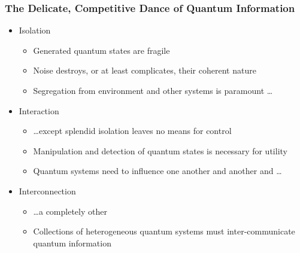 \documentclass[handout]{beamer}
\begin{document}
\begin{frame}
  \frametitle{The Delicate, Competitive Dance of Quantum Information}
  \begin{itemize}
  \item Isolation
    \begin{itemize}
    \item Generated quantum states are fragile
    \item Noise destroys, or at least complicates, their coherent nature
    \item Segregation from environment and other systems is paramount \ldots
    \end{itemize}

  \item Interaction
    \begin{itemize}
    \item \ldots except splendid isolation leaves no means for control
    \item Manipulation and detection of quantum states is necessary for
      utility
    \item Quantum systems need to influence one another and another
      and \ldots
    \end{itemize}

  \item Interconnection
    \begin{itemize}
    \item \ldots a completely other
    \item Collections of heterogeneous quantum systems must inter-communicate
      quantum information  
    \end{itemize}

  \end{itemize}
\end{frame}
\end{document}
